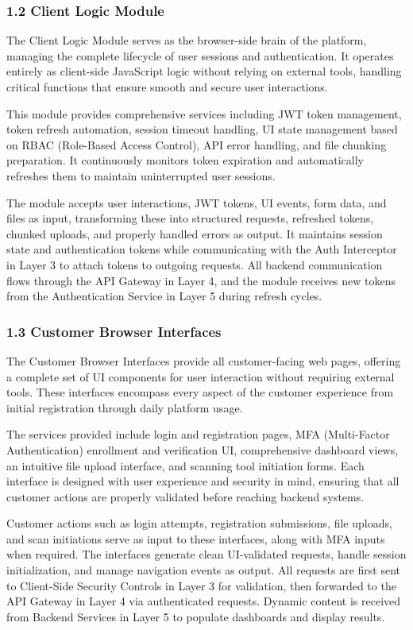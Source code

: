 \documentclass[12pt,a4paper]{report}
\begin{document}
\subsubsection{1.2 Client Logic Module}

The Client Logic Module serves as the browser-side brain of the platform, managing the complete lifecycle of user sessions and authentication. It operates entirely as client-side JavaScript logic without relying on external tools, handling critical functions that ensure smooth and secure user interactions.

This module provides comprehensive services including JWT token management, token refresh automation, session timeout handling, UI state management based on RBAC (Role-Based Access Control), API error handling, and file chunking preparation. It continuously monitors token expiration and automatically refreshes them to maintain uninterrupted user sessions.

The module accepts user interactions, JWT tokens, UI events, form data, and files as input, transforming these into structured requests, refreshed tokens, chunked uploads, and properly handled errors as output. It maintains session state and authentication tokens while communicating with the Auth Interceptor in Layer 3 to attach tokens to outgoing requests. All backend communication flows through the API Gateway in Layer 4, and the module receives new tokens from the Authentication Service in Layer 5 during refresh cycles.

\subsubsection{1.3 Customer Browser Interfaces}

The Customer Browser Interfaces provide all customer-facing web pages, offering a complete set of UI components for user interaction without requiring external tools. These interfaces encompass every aspect of the customer experience from initial registration through daily platform usage.

The services provided include login and registration pages, MFA (Multi-Factor Authentication) enrollment and verification UI, comprehensive dashboard views, an intuitive file upload interface, and scanning tool initiation forms. Each interface is designed with user experience and security in mind, ensuring that all customer actions are properly validated before reaching backend systems.

Customer actions such as login attempts, registration submissions, file uploads, and scan initiations serve as input to these interfaces, along with MFA inputs when required. The interfaces generate clean UI-validated requests, handle session initialization, and manage navigation events as output. All requests are first sent to Client-Side Security Controls in Layer 3 for validation, then forwarded to the API Gateway in Layer 4 via authenticated requests. Dynamic content is received from Backend Services in Layer 5 to populate dashboards and display results.
\end{document}
